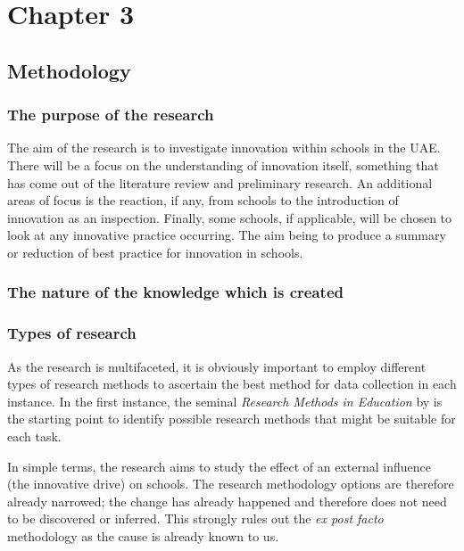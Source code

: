 \section{Chapter 3}
\subsection{Methodology}

\subsubsection{The purpose of the research}
The aim of the research is to investigate innovation within schools in the UAE. There will be a focus on the understanding of innovation itself, something that has come out of the literature review and preliminary research. An additional areas of focus is the reaction, if any, from schools to the introduction of innovation as an inspection. Finally, some schools, if applicable, will be chosen to look at any innovative practice occurring. The aim being to produce a summary or reduction of best practice for innovation in schools.

\subsubsection{The nature of the knowledge which is created}

\subsubsection{Types of research}

As the research is multifaceted, it is obviously important to employ different types of research methods to ascertain the best method for data collection in each instance. In the first instance, the seminal \textit{Research Methods in Education} by \citet{Cohen2005} is the starting point to identify possible research methods that might be suitable for each task.

In simple terms, the research aims to study the effect of an external influence (the innovative drive) on schools. The research methodology options are therefore already narrowed; the change has already happened and therefore does not need to be discovered or inferred. This strongly rules out the \textit{ex post facto} methodology as the cause is already known to us.

